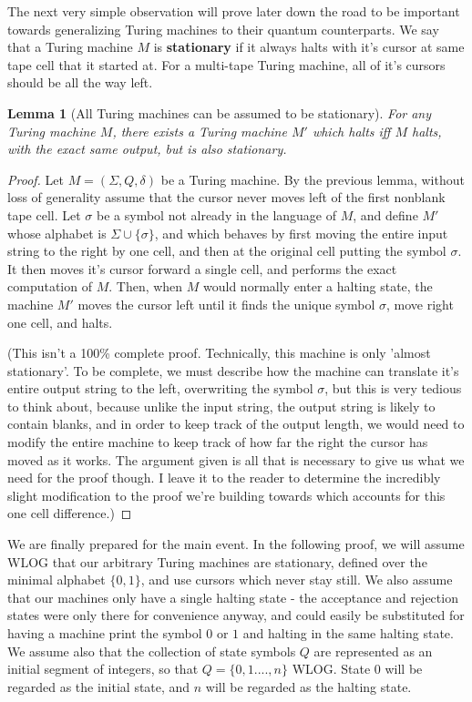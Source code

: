 \documentclass{article}
\theoremstyle{definition}
\theoremstyle{plain}
\theoremstyle{theorem}
\newtheorem{lemma}{Lemma}[section]
\begin{document}
The next very simple observation will prove later down the road to be important towards generalizing Turing machines to their quantum counterparts. We say that a Turing machine $M$ is \textbf{stationary} if it always halts with it's cursor at same tape cell that it started at. For a multi-tape Turing machine, all of it's cursors should be all the way left.
\begin{lemma}[All Turing machines can be assumed to be stationary]
	For any Turing machine $M$, there exists a Turing machine $M'$ which halts iff $M$ halts, with the exact same output, but is also stationary.
\end{lemma}
\begin{proof}
	Let $M = (\Sigma,Q,\delta)$ be a Turing machine. By the previous lemma, without loss of generality assume that the cursor never moves left of the first nonblank tape cell. Let $\sigma$ be a symbol not already in the language of $M$, and define $M'$ whose alphabet is $\Sigma \cup \{\sigma\}$, and which behaves by first moving the entire input string to the right by one cell, and then at the original cell putting the symbol $\sigma$. It then moves it's cursor forward a single cell, and performs the exact computation of $M$. Then, when $M$ would normally enter a halting state, the machine $M'$ moves the cursor left until it finds the unique symbol $\sigma$, move right one cell, and halts. \par (This isn't a 100\% complete proof. Technically, this machine is only 'almost stationary'. To be complete, we must describe how the machine can translate it's entire output string to the left, overwriting the symbol $\sigma$, but this is very tedious to think about, because unlike the input string, the output string is likely to contain blanks, and in order to keep track of the output length, we would need to modify the entire machine to keep track of how far the right the cursor has moved as it works. The argument given is all that is necessary to give us what we need for the proof though. I leave it to the reader to determine the incredibly slight modification to the proof we're building towards which accounts for this one cell difference.)
\end{proof}
We are finally prepared for the main event. In the following proof, we will assume WLOG that our arbitrary Turing machines are stationary, defined over the minimal alphabet $\{0,1\}$, and use cursors which never stay still. We also assume that our machines only have a single halting state - the acceptance and rejection states were only there for convenience anyway, and could easily be substituted for having a machine print the symbol $0$ or $1$ and halting in the same halting state. We assume also that the collection of state symbols $Q$ are represented as an initial segment of integers, so that $Q = \{0,1....,n\}$ WLOG. State $0$ will be regarded as the initial state, and $n$ will be regarded as the halting state.
\end{document}
